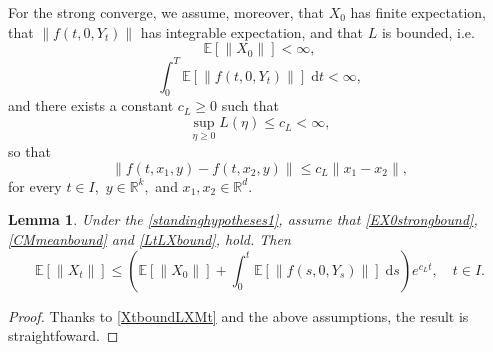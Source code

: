 \documentclass[reqno,12pt]{amsart}
\theoremstyle{plain} %
\newtheorem{lemma}{Lemma}[section]
\theoremstyle{definition} %
\begin{document}
For the strong converge, we assume, moreover, that $X_0$ has finite expectation, that $\|f(t, 0, Y_t)\|$ has integrable expectation, and that $L$ is bounded, i.e.
\begin{equation}
    \label{EX0strongbound}
    \mathbb{E}[\|X_0\|] < \infty,
\end{equation}
\begin{equation}
    \label{CMmeanbound}
    \int_0^T \mathbb{E}\left[\|f(t, 0, Y_t)\|\right] \;\mathrm{d}t < \infty,
\end{equation}
and there exists a constant $c_L \geq 0$ such that
\begin{equation}
    \label{LtLXbound}
    \sup_{\eta \geq 0} L(\eta) \leq c_L < \infty,
\end{equation}
so that
\begin{equation}
    \|f(t, x_1, y) - f(t, x_2, y)\| \leq c_L \|x_1 - x_2\|,
\end{equation}
for every $t\in I,$ $y\in\mathbb{R}^k,$ and $x_1, x_2 \in\mathbb{R}^d.$

\begin{lemma}
    \label{lemstrongbound}
    Under the \cref{standinghypotheses1}, assume that \eqref{EX0strongbound}, \eqref{CMmeanbound} and \eqref{LtLXbound},   hold. Then
    \begin{equation}
        \label{EXtstrongbound}
        \mathbb{E}[\|X_t\|] \leq \left(\mathbb{E}[\|X_0\|] + \int_0^t \mathbb{E}[\|f(s, 0, Y_s)\|]\;\mathrm{d}s\right) e^{c_L t}, \quad t\in I.
    \end{equation}
\end{lemma}

\begin{proof}
    Thanks to \eqref{XtboundLXMt} and the above assumptions, the result is straightfoward.
\end{proof}
\end{document}
